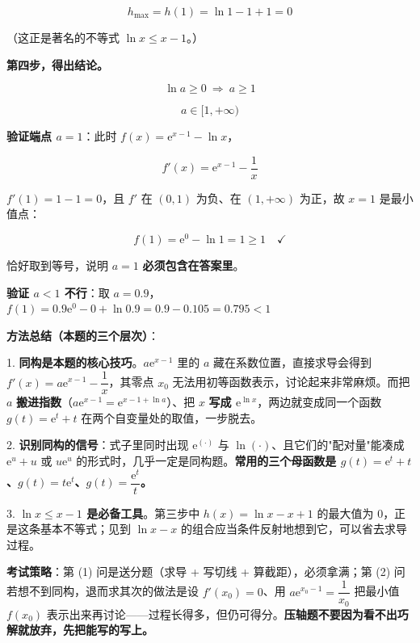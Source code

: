 \begin{answer}
\nopagebreak[4]
\[h_{\max}=h(1)=\ln1-1+1=0\]

（这正是著名的不等式 $\ln x\le x-1$。）

\textbf{第四步，得出结论。}

\nopagebreak[4]
\[\ln a\ge0\ \Longrightarrow\ a\ge1\]

\nopagebreak[4]
\[\boxed{a\in[1,+\infty)}\]

\textbf{验证端点 $a=1$}：此时 $f(x)=\mathrm e^{x-1}-\ln x$，

\nopagebreak[4]
\[f'(x)=\mathrm e^{x-1}-\frac1x\]

$f'(1)=1-1=0$，且 $f'$ 在 $(0,1)$ 为负、在 $(1,+\infty)$ 为正，故 $x=1$ 是最小值点：

\nopagebreak[4]
\[f(1)=\mathrm e^{0}-\ln1=1\ge1\quad\checkmark\]

恰好取到等号，说明 $a=1$ \textbf{必须包含在答案里}。

\textbf{验证 $a<1$ 不行}：取 $a=0.9$，$f(1)=0.9\mathrm e^{0}-0+\ln0.9=0.9-0.105=0.795<1$ 

\par\medskip

\begin{gktip}
\textbf{方法总结（本题的三个层次）}：

1. \textbf{同构是本题的核心技巧}。$a\mathrm e^{x-1}$ 里的 $a$ 藏在系数位置，直接求导会得到 $f'(x)=a\mathrm e^{x-1}-\dfrac1x$，其零点 $x_0$ 无法用初等函数表示，讨论起来非常麻烦。而把 $a$ \textbf{搬进指数}（$a\mathrm e^{x-1}=\mathrm e^{x-1+\ln a}$）、把 $x$ \textbf{写成 $\mathrm e^{\ln x}$}，两边就变成同一个函数 $g(t)=\mathrm e^{t}+t$ 在两个自变量处的取值，一步脱去。

2. \textbf{识别同构的信号}：式子里同时出现 $\mathrm e^{(\cdot)}$ 与 $\ln(\cdot)$、且它们的"配对量"能凑成 $\mathrm e^{u}+u$ 或 $u\mathrm e^{u}$ 的形式时，几乎一定是同构题。\textbf{常用的三个母函数是 $g(t)=\mathrm e^{t}+t$、$g(t)=t\mathrm e^{t}$、$g(t)=\dfrac{\mathrm e^{t}}t$。}

3. \textbf{$\ln x\le x-1$ 是必备工具}。第三步中 $h(x)=\ln x-x+1$ 的最大值为 $0$，正是这条基本不等式；见到 $\ln x-x$ 的组合应当条件反射地想到它，可以省去求导过程。

\textbf{考试策略}：第 (1) 问是送分题（求导 + 写切线 + 算截距），必须拿满；第 (2) 问若想不到同构，退而求其次的做法是设 $f'(x_0)=0$、用 $a\mathrm e^{x_0-1}=\dfrac1{x_0}$ 把最小值 $f\left(x_0\right)$ 表示出来再讨论——过程长得多，但仍可得分。\textbf{压轴题不要因为看不出巧解就放弃，先把能写的写上。}
\end{gktip}


\gkanswer{答案（2）：$a\in[1,+\infty)$}

\end{answer}